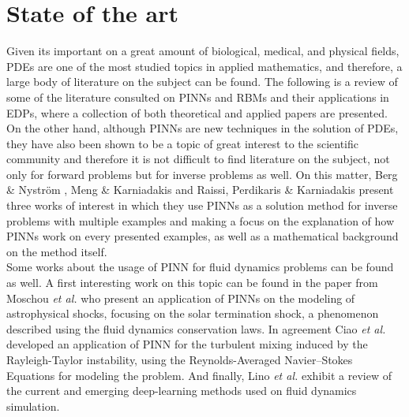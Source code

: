 \documentclass[12pt,letterpaper]{article}
\begin{document}

\section{State of the art}

Given its important on a great amount of biological, medical, and physical fields, PDEs are one of the most studied topics in applied mathematics, and therefore, a large body of literature on the subject can be found. The following is a review of some of the literature consulted on PINNs and RBMs and their applications in EDPs, where a collection of both theoretical and applied papers are presented.\\

On the other hand, although PINNs are new techniques in the solution of PDEs, they have also been shown to be a topic of great interest to the scientific community and therefore it is not difficult to find literature on the subject, not only for forward problems but for inverse problems as well. On this matter, Berg \& Nyström \cite{berg2021neural} , Meng \& Karniadakis \cite{meng2020composite} and Raissi, Perdikaris \& Karniadakis \cite{raissi2019physics} present three works of interest in which they use PINNs as a solution method for inverse problems with multiple examples and making a focus on the explanation of how PINNs work on every presented examples, as well as a mathematical background on the method itself.\\

Some works about the usage of PINN for fluid dynamics problems can be found as well. A first interesting work on this topic can be found in the paper from Moschou \textit{et al.} \cite{moschou2023physics} who present an application of PINNs on the modeling of astrophysical shocks, focusing on the solar termination shock, a phenomenon described using the fluid dynamics conservation laws. In agreement Ciao \textit{et al.} \cite{xiao2023physics} developed an application of PINN for the turbulent mixing induced by the Rayleigh-Taylor instability, using the Reynolds-Averaged Navier–Stokes Equations for modeling the problem. And finally, Lino \textit{et al.} \cite{lino2023current} exhibit a review of the current and emerging deep-learning methods used on fluid dynamics simulation.
\end{document}
